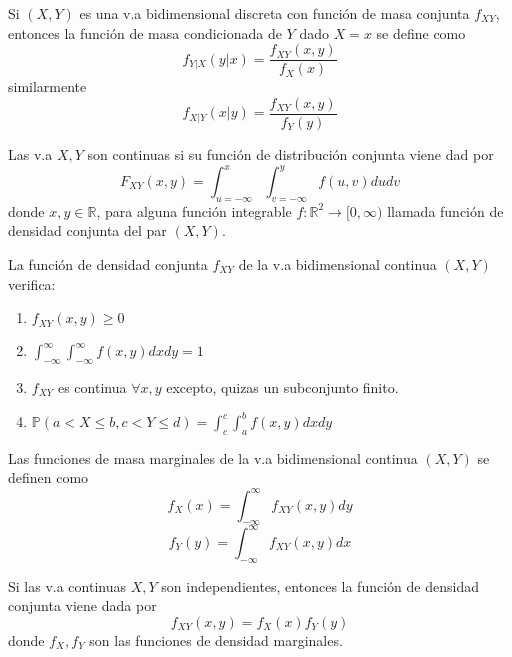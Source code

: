 \begin{defn}
Si $(X,Y)$ es una v.a bidimensional discreta con función de masa conjunta $f_{XY}$, entonces la función de masa condicionada de $Y$ dado $X=x$ se define como \[ f_{Y|X}(y|x) = \frac{f_{XY}(x,y)}{f_{X}(x)} \] similarmente \[ f_{X|Y}(x|y) = \frac{f_{XY}(x,y)}{f_{Y}(y)} \]
\end{defn}

\begin{defn}
Las v.a $X,Y$ son continuas si su función de distribución conjunta viene dad por \[ F_{XY}(x,y) = \int_{u=-\infty}^x \int_{v=-\infty}^y f(u,v)du dv \] donde $x,y\in\mathbb{R}$, para alguna función integrable $f:\mathbb{R}^2\rightarrow [0,\infty)$ llamada función de densidad conjunta del par $(X,Y)$.
\end{defn}

\begin{prop}
La función de densidad conjunta $f_{XY}$ de la v.a bidimensional continua $(X,Y)$ verifica:

\begin{enumerate}[label=(\roman*)]
    \item $f_{XY}(x,y) \geq 0$
    \item $\int_{-\infty}^\infty \int_{-\infty}^\infty f(x,y)dx dy = 1$
    \item $f_{XY}$ es continua $\forall x,y$ excepto, quizas un subconjunto finito.
    \item $\mathbb{P}(a < X \leq b, c < Y \leq d) = \int_{c}^c \int_{a}^b f(x,y)dx dy$
\end{enumerate}
\end{prop}

\begin{defn}
Las funciones de masa marginales de la v.a bidimensional continua $(X,Y)$ se definen como \[ f_X(x) = \int_{-\infty}^\infty f_{XY}(x,y)dy \] \[ f_Y(y) = \int_{-\infty}^\infty f_{XY}(x,y)dx \]
\end{defn}

\begin{prop}
Si las v.a continuas $X,Y$ son independientes, entonces la función de densidad conjunta viene dada por \[ f_{XY}(x,y)=f_{X}(x)f_{Y}(y) \] donde $f_{X}, f_{Y}$ son las funciones de densidad marginales.
\end{prop}

